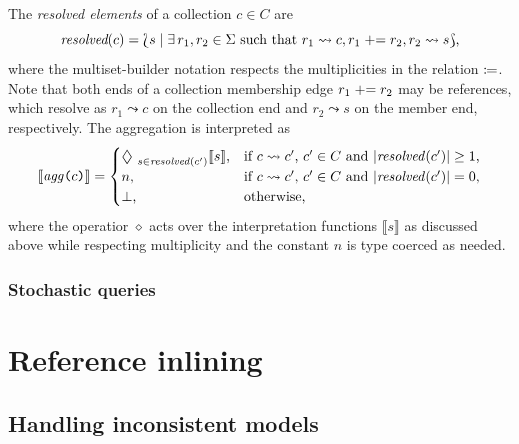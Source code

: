 The \emph{resolved elements} of a collection \(c \in C\) are
\begin{equation}
  \emph{resolved}(c) = \Lbag s \mid \exists\, r_1, r_2 \in \Sigma \text{ such that } r_1 \leadsto c, r_1 \mathrel{{+}{=}} r_2, r_2 \leadsto s \Rbag \text,
\end{equation}
where the multiset-builder notation respects the multiplicities in the relation \(\coloneq\). Note that both ends of a collection membership edge \(r_1 \mathrel{{+}{=}} r_2\) may be references, which resolve as \(r_1 \leadsto c\) on the collection end and \(r_2 \leadsto s\) on the member end, respectively. The aggregation  is interpreted as
\begin{equation}
  \llbracket \rel{agg} \lit( c \lit) \rrbracket = \begin{cases}
    \bigDiamond_{s \in \rel{resolved}(c')} \llbracket s \rrbracket \text, & \text{if \(c \leadsto c'\), \(c' \in C\) and \(\lvert \rel{resolved}(c') \rvert \ge 1\),} \\
    n \text, & \text{if \(c \leadsto c'\), \(c' \in C\) and \(\lvert \rel{resolved}(c') \rvert = 0\),} \\
    {\perp} \text, & \text{otherwise,}
  \end{cases}
\end{equation}
where the operatior \(\diamond\) acts over the interpretation functions \(\llbracket s \rrbracket\) as discussed above while respecting multiplicity and the constant \(n\) is type coerced as needed.

\subsubsection{Stochastic queries}


\section{Reference inlining}
\label{sec:rgspn:inlining}

\subsection{Handling inconsistent models}
\label{ssec:rgspn:inconsistent}


